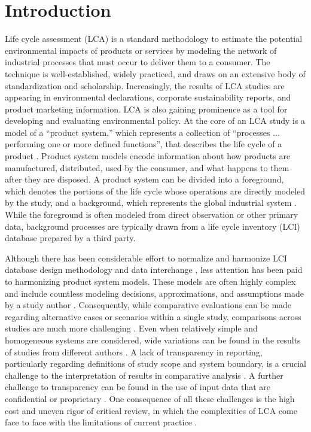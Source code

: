 \section{Introduction}

Life cycle assessment (LCA) is a standard methodology to estimate the potential environmental impacts of products or services by modeling the network of industrial processes that must occur to deliver 
them to a consumer.  The technique is well-established, widely practiced, and draws on an extensive body of standardization and scholarship.
Increasingly, the results of LCA studies are appearing in environmental declarations, corporate sustainability reports, and product marketing information.  LCA is also gaining prominence as a tool for developing and evaluating environmental policy.  
%
At the core of an LCA study is a model of a ``product system,'' which represents a collection of ``processes $\ldots$ performing one or more defined functions'', that describes the life cycle of a product \citep{iso14044}.  Product system models encode information about how products are manufactured, distributed, used by the consumer, and what happens to them after they are disposed.  A product system can be divided into a foreground, which denotes the portions of the life cycle whose operations are directly modeled by the study, and a background, which represents the global industrial system \citep{SETAC_inventory_1998}.  While the foreground is often modeled from direct observation or other primary data, background processes are typically drawn from a life cycle inventory (LCI) database prepared by a third party.

Although there has been considerable effort to normalize and harmonize 
LCI database design methodology and data interchange \citep{UNEP_2011, JRC_ILCD_ELCD_2013, Mila_e_Canals_2015, Ingwersen_JLCA_2015}, less attention has been paid to harmonizing product system models.  These models are often highly complex and include countless modeling decisions, approximations, and assumptions made by a study author \citep{Lloyd2007, reap2008_I}.  Consequently, while comparative evaluations can be made regarding alternative cases or scenarios within a single study, comparisons across studies are much more challenging \citep{Heath2012, Henriksson2014}.  Even when relatively simple and homogeneous systems are considered, wide variations can be found in the results of studies from different authors \citep{van_der_Harst_2013, Turconi_2013}.
A lack of transparency in reporting, particularly regarding definitions of study scope and system boundary,
is a crucial challenge to the interpretation of results in comparative analysis \citep{Cleary2009, Laurent_2014}.  A further challenge to transparency can be found in the use of input data that are confidential or proprietary \citep{Kuczenski_2017}.  One consequence of all these challenges is the high cost and uneven rigor of critical review, in which the complexities of LCA come face to face with the limitations of current practice \citep{Curran2014}.  


